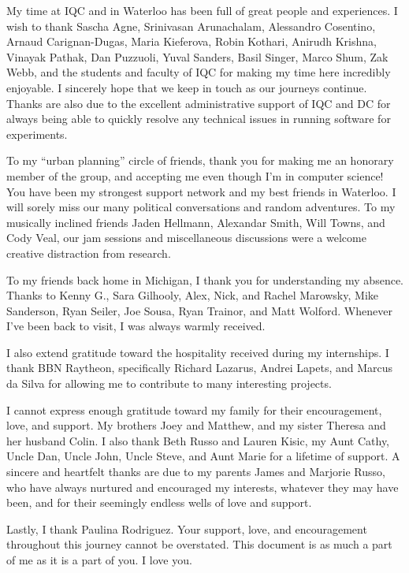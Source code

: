 My time at IQC and in Waterloo has been full of great people and experiences. I wish to thank Sascha Agne, Srinivasan Arunachalam, Alessandro Cosentino, Arnaud Carignan-Dugas, Maria Kieferova, Robin Kothari, Anirudh Krishna, Vinayak Pathak, Dan Puzzuoli, Yuval Sanders, Basil Singer, Marco Shum, Zak Webb, and the students and faculty of IQC for making my time here incredibly enjoyable. I sincerely hope that we keep in touch as our journeys continue. Thanks are also due to the excellent administrative support of IQC and DC for always being able to quickly resolve any technical issues in running software for experiments.

To my ``urban planning'' circle of friends, thank you for making me an honorary member of the group, and accepting me even though I'm in computer science! You have been my strongest support network and my best friends in Waterloo. I will sorely miss our many political conversations and random adventures. To my musically inclined friends Jaden Hellmann, Alexandar Smith, Will Towns, and Cody Veal, our jam sessions and miscellaneous discussions were a welcome creative distraction from research. 

To my friends back home in Michigan, I thank you for understanding my absence. Thanks to Kenny G., Sara Gilhooly, Alex, Nick, and Rachel Marowsky, Mike Sanderson, Ryan Seiler, Joe Sousa, Ryan Trainor, and Matt Wolford. Whenever I've been back to visit, I was always warmly received. 

I also extend gratitude toward the hospitality received during my internships. I thank BBN Raytheon, specifically Richard Lazarus, Andrei Lapets, and Marcus da Silva for allowing me to contribute to many interesting projects. 

I cannot express enough gratitude toward my family for their encouragement, love, and support. My brothers Joey and Matthew, and my sister Theresa and her husband Colin. I also thank Beth Russo and Lauren Kisic, my Aunt Cathy, Uncle Dan, Uncle John, Uncle Steve, and Aunt Marie for a lifetime of support. A sincere and heartfelt thanks are due to my parents James and Marjorie Russo, who have always nurtured and encouraged my interests, whatever they may have been, and for their seemingly endless wells of love and support. 

Lastly, I thank Paulina Rodriguez. Your support, love, and encouragement throughout this journey cannot be overstated. This document is as much a part of me as it is a part of you. I love you. 


